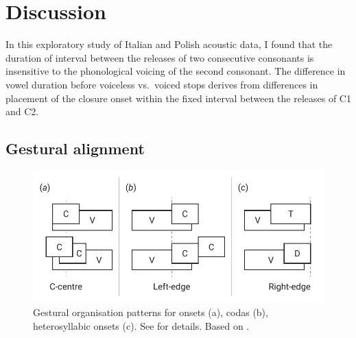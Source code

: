 \documentclass[preprint]{JASAnew}
\begin{document}
\hypertarget{discussion}{%
\section{Discussion}\label{discussion}}

In this exploratory study of Italian and Polish acoustic data, I found
that the duration of interval between the releases of two consecutive
consonants is insensitive to the phonological voicing of the second
consonant. The difference in vowel duration before voiceless vs.~voiced
stops derives from differences in placement of the closure onset within
the fixed interval between the releases of C1 and C2.

\hypertarget{gestural-alignment}{%
\subsection{Gestural alignment}\label{gestural-alignment}}

\label{s:gestural}

\begin{figure}
  \centering
  \includegraphics{img/gorganisation.pdf}
  \caption{Gestural organisation patterns for onsets (a), codas (b), heterosyllabic onsets (c). See  for details. Based on \citet{marin2010}.}
  \label{f:gorganisation}
\end{figure}
\end{document}
